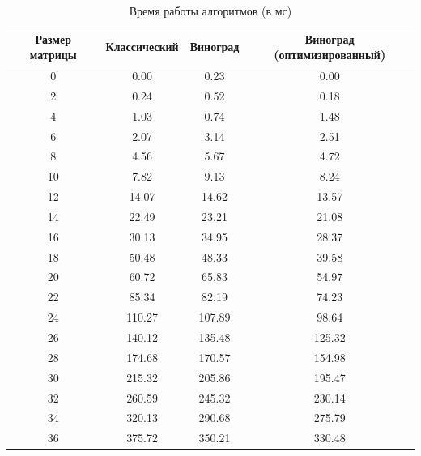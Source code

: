 \begin{table}[h]
    \begin{center}
        \begin{threeparttable}
            \captionsetup{justification=raggedright,singlelinecheck=off}
            \caption{Время работы алгоритмов (в мс)}
            \label{tbl}
            \begin{tabular}{|c|c|c|c|}
                \hline
                Размер матрицы & Классический & Виноград & Виноград (оптимизированный) \\
                \hline
                0  & 0.00  & 0.23  & 0.00  \\
                \hline
                2  & 0.24  & 0.52  & 0.18  \\
                \hline
                4  & 1.03  & 0.74  & 1.48  \\
                \hline
                6  & 2.07  & 3.14  & 2.51  \\
                \hline
                8  & 4.56  & 5.67  & 4.72  \\
                \hline
                10 & 7.82  & 9.13  & 8.24  \\
                \hline
                12 & 14.07 & 14.62 & 13.57 \\
                \hline
                14 & 22.49 & 23.21 & 21.08 \\
                \hline
                16 & 30.13 & 34.95 & 28.37 \\
                \hline
                18 & 50.48 & 48.33 & 39.58 \\
                \hline
                20 & 60.72 & 65.83 & 54.97 \\
                \hline
                22 & 85.34 & 82.19 & 74.23 \\
                \hline
                24 & 110.27 & 107.89 & 98.64 \\
                \hline
                26 & 140.12 & 135.48 & 125.32 \\
                \hline
                28 & 174.68 & 170.57 & 154.98 \\
                \hline
                30 & 215.32 & 205.86 & 195.47 \\
                \hline
                32 & 260.59 & 245.32 & 230.14 \\
                \hline
                34 & 320.13 & 290.68 & 275.79 \\
                \hline
                36 & 375.72 & 350.21 & 330.48 \\

\end{tabular}
\end{threeparttable}
\end{center}
\end{table}

